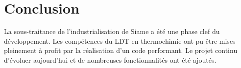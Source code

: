 
\chapter*{Conclusion}

La sous-traitance de l'industrialisation de Siame a été une phase clef du développement. Les compétences du LDT en thermochimie ont pu être mises pleinement à profit par la réalisation d'un code performant. Le projet continu d'évoluer aujourd'hui et de nombreuses fonctionnalités ont été ajoutés.
